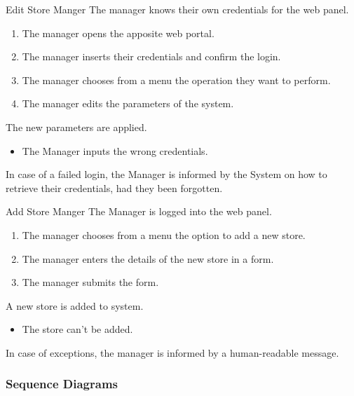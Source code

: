 \usecase
{Edit Store}
{Manger}
{The manager knows their own credentials for the web panel.}
{
    \begin{enumerate}
        \item The manager opens the apposite web portal.
        \item The manager inserts their credentials and confirm the login.
        \item The manager chooses from a menu the operation they want to perform.
        \item The manager edits the parameters of the system.
    \end{enumerate}
}
{
    The new parameters are applied.
}
{
    \begin{itemize}
        \item The Manager inputs the wrong credentials.
    \end{itemize}
}
{
    In case of a failed login, the Manager is informed by the System on how to retrieve their credentials, had they been forgotten.
}

\usecase
{Add Store}
{Manger}
{The Manager is logged into the web panel.}
{
    \begin{enumerate}
        \item The manager chooses from a menu the option to add a new store.
        \item The manager enters the details of the new store in a form.
        \item The manager submits the form.
    \end{enumerate}
}
{
    A new store is added to system.
}
{
    \begin{itemize}
        \item The store can't be added.
    \end{itemize}
}
{
    In case of exceptions, the manager is informed by a human-readable message.
}


\subsubsection{Sequence Diagrams}

